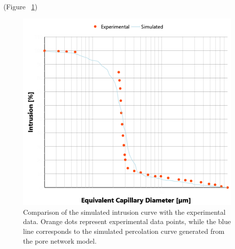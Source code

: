 \documentclass[review]{elsarticle}
\begin{document}
  (Figure ~\ref{fig:PXfittinggraph})
\begin{figure}
    \centering
    \includegraphics[width=0.9\columnwidth]{./Media/Fit to percolation curve.png}
    \caption{Comparison of the simulated intrusion curve with the experimental data. 
             Orange dots represent experimental data points, while the blue line 
             corresponds to the simulated percolation curve generated from the 
             pore network model.}
    \label{fig:PXfittinggraph}
\end{figure}
\end{document}
